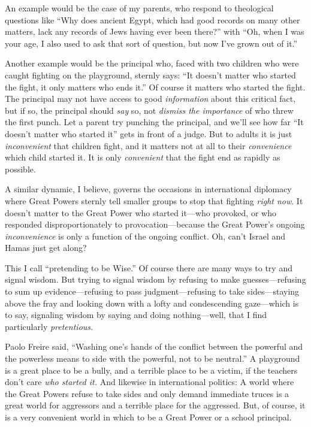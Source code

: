 {
 An example would be the case of my parents, who respond to
theological questions like ``Why does ancient Egypt,
which had good records on many other matters, lack any records of Jews
having ever been there?'' with ``Oh,
when I was your age, I also used to ask that sort of question, but now
I've grown out of it.''}

{
 Another example would be the principal who, faced with two
children who were caught fighting on the playground, sternly says:
``It doesn't matter who started the
fight, it only matters who ends it.'' Of course it
matters who started the fight. The principal may not have access to
good \textit{information} about this critical fact, but if so, the
principal should \textit{say} so, not \textit{dismiss the importance}
of who threw the first punch. Let a parent try punching the principal,
and we'll see how far ``It
doesn't matter who started it'' gets
in front of a judge. But to adults it is just \textit{inconvenient}
that children fight, and it matters not at all to their
\textit{convenience} which child started it. It is only
\textit{convenient} that the fight end as rapidly as possible.}

{
 A similar dynamic, I believe, governs the occasions in
international diplomacy where Great Powers sternly tell smaller groups
to stop that fighting \textit{right now}. It doesn't
matter to the Great Power who started it---who provoked, or who
responded disproportionately to provocation---because the Great
Power's ongoing \textit{inconvenience} is only a
function of the ongoing conflict. Oh, can't Israel and
Hamas just get along?}

{
 This I call ``pretending to be
Wise.'' Of course there are many ways to try and
signal wisdom. But trying to signal wisdom by refusing to make
guesses---refusing to sum up evidence---refusing to pass
judgment---refusing to take sides---staying above the fray and looking
down with a lofty and condescending gaze---which is to say, signaling
wisdom by saying and doing nothing---well, that I find particularly
\textit{pretentious.}}

{
 Paolo Freire said, ``Washing
one's hands of the conflict between the powerful and
the powerless means to side with the powerful, not to be
neutral.'' A playground is a great
place to be a bully, and a terrible place to be a victim, if the
teachers don't care \textit{who started it.} And
likewise in international politics: A world where the Great Powers
refuse to take sides and only demand immediate truces is a great world
for aggressors and a terrible place for the aggressed. But, of course,
it is a very convenient world in which to be a Great Power or a school
principal.}

